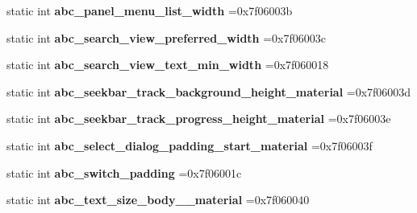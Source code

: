 \begin{DoxyCompactItemize}
static int {\bfseries abc\+\_\+panel\+\_\+menu\+\_\+list\+\_\+width} =0x7f06003b
\item 
\mbox{\label{classandroid_1_1support_1_1v7_1_1appcompat_1_1R_1_1dimen_a6ef4a76a66422404229a3eaa16f153a5}} 
static int {\bfseries abc\+\_\+search\+\_\+view\+\_\+preferred\+\_\+width} =0x7f06003c
\item 
\mbox{\label{classandroid_1_1support_1_1v7_1_1appcompat_1_1R_1_1dimen_a33227e1f31241fddbfa36806e95df9a2}} 
static int {\bfseries abc\+\_\+search\+\_\+view\+\_\+text\+\_\+min\+\_\+width} =0x7f060018
\item 
\mbox{\label{classandroid_1_1support_1_1v7_1_1appcompat_1_1R_1_1dimen_afce41d2471d09e0b43edff364b0ac5b7}} 
static int {\bfseries abc\+\_\+seekbar\+\_\+track\+\_\+background\+\_\+height\+\_\+material} =0x7f06003d
\item 
\mbox{\label{classandroid_1_1support_1_1v7_1_1appcompat_1_1R_1_1dimen_a89c8a0df392c27356feefe7f0cf84683}} 
static int {\bfseries abc\+\_\+seekbar\+\_\+track\+\_\+progress\+\_\+height\+\_\+material} =0x7f06003e
\item 
\mbox{\label{classandroid_1_1support_1_1v7_1_1appcompat_1_1R_1_1dimen_a3bda280982ce90aba9e3d7d054b5d6fa}} 
static int {\bfseries abc\+\_\+select\+\_\+dialog\+\_\+padding\+\_\+start\+\_\+material} =0x7f06003f
\item 
\mbox{\label{classandroid_1_1support_1_1v7_1_1appcompat_1_1R_1_1dimen_afa23ac9a5d71ff1843578d2461a11026}} 
static int {\bfseries abc\+\_\+switch\+\_\+padding} =0x7f06001c
\item 
\mbox{\label{classandroid_1_1support_1_1v7_1_1appcompat_1_1R_1_1dimen_a0df2c18c862a7d7699d6db7760245d90}} 
static int {\bfseries abc\+\_\+text\+\_\+size\+\_\+body\+\_\+\_\+material} =0x7f060040
\item 
\mbox{\label{classandroid_1_1support_1_1v7_1_1appcompat_1_1R_1_1dimen_afdee019fc79069caf587852ddfde84d8}} 

\end{DoxyCompactItemize}
